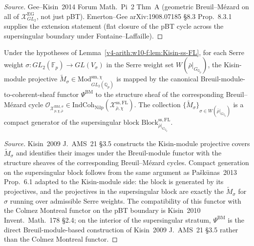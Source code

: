 \begin{proof}[Source]
Gee--Kisin~2014 Forum Math.~Pi~2 Thm~A (geometric Breuil--M{\'e}zard
on all of \(\mathcal{X}^{\mathrm{EG}}_{GL_{2}}\), not just pBT).
Emerton--Gee arXiv:1908.07185 \S 8.3 Prop.~8.3.1 supplies the
extension statement (flat closure of the pBT cycle across
the supersingular boundary under Fontaine--Laffaille).
\end{proof}

\begin{lemma}
\label{v4-arith:w10-f:lem:Kisin-ss-gen}
Under the hypotheses of
Lemma~\ref{v4-arith:w10-f:lem:Kisin-ss-FL}, for each Serre weight
\(\sigma\colon GL_{2}(\mathbb{F}_{p})\to GL(V_{\sigma})\) in the Serre
weight set \(W(\bar\rho|_{G_{\mathbb{Q}_{p}}})\), the Kisin-module
projective
\(\widetilde{M}_{\sigma}\in\mathrm{Mod}^{\mathrm{sm},\chi}_{GL_{2}(\mathbb{Q}_{p})}\)
is mapped by the canonical Breuil-module-to-coherent-sheaf functor
\(\Psi^{\mathrm{BM}}\) to the structure sheaf of the corresponding
Breuil--M{\'e}zard cycle
\(\mathcal{O}_{\mathcal{X}^{\mathrm{BM},\sigma}_{p,\chi,\bar\rho}}
\in\mathrm{IndCoh}_{\mathrm{Nilp}}
(\mathcal{X}^{\mathrm{ss,FL}}_{\bar\rho,\chi})\). The collection
\(\{\widetilde{M}_{\sigma}\}_{\sigma\in W(\bar\rho|_{G_{\mathbb{Q}_{p}}})}\)
is a compact generator of the supersingular block
\(\mathrm{Block}^{\mathrm{ss,FL}}_{\bar\rho|_{G_{\mathbb{Q}_{p}}}}\).
\end{lemma}

\begin{proof}[Source]
Kisin~2009 J.~AMS~21 \S 3.5 constructs the Kisin-module projective
covers \(\widetilde{M}_{\sigma}\) and identifies their images under the
Breuil-module functor with the structure sheaves of the corresponding
Breuil--M{\'e}zard cycles. Compact generation on the supersingular
block follows from the same argument as Pa{\v s}k{\=u}nas~2013
Prop.~6.1 adapted to the Kisin-module side: the block is generated by
its projectives, and the projectives in the supersingular block are
exactly the \(\widetilde{M}_{\sigma}\) for \(\sigma\) running over
admissible Serre weights. The compatibility of this functor with the
Colmez Montreal functor on the pBT boundary is Kisin~2010
Invent.~Math.~178 \S 2.4; on the interior of the supersingular
stratum, \(\Psi^{\mathrm{BM}}\) is the direct Breuil-module-based
construction of Kisin~2009 J.~AMS~21 \S 3.5 rather than the Colmez
Montreal functor.
\end{proof}

